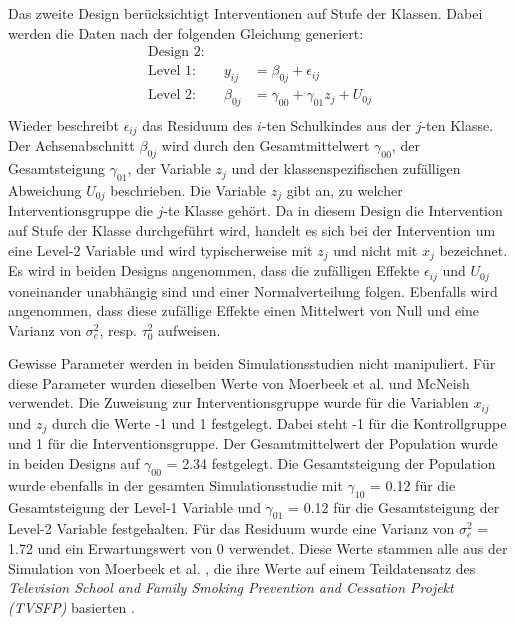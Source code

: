 \documentclass[12pt]{article}\usepackage[]{graphicx}\usepackage[]{color}
\begin{document}
Das zweite Design berücksichtigt Interventionen auf Stufe der Klassen. Dabei werden die Daten nach der folgenden Gleichung generiert:
\begin{equation} 
\begin{split}
 \text{Design 2:}\\
  \text{Level 1:}  \qquad y_{ij} & = \beta_{0j} + \epsilon_{ij}\\
 \text{Level 2:} \qquad \beta_{0j} & = \gamma_{00} + \gamma_{01}z_{j} + U_{0j}\\
\end{split}	
\end{equation} 
Wieder beschreibt $\epsilon_{ij}$ das Residuum des $i$-ten Schulkindes aus der $j$-ten Klasse. Der Achsenabschnitt $\beta_{0j}$ wird durch den Gesamtmittelwert $\gamma_{00}$, der Gesamtsteigung $\gamma_{01}$, der Variable $z_{j}$ und der klassenspezifischen zufälligen Abweichung $U_{0j}$ beschrieben. Die Variable $z_{j}$ gibt an, zu welcher Interventionsgruppe die $j$-te Klasse gehört. Da in diesem Design die Intervention auf Stufe der Klasse durchgeführt wird, handelt es sich bei der Intervention um eine Level-2 Variable und wird typischerweise mit $z_{j}$ und nicht mit $x_{j}$ bezeichnet. Es wird in beiden Designs angenommen, dass die zufälligen Effekte $\epsilon_{ij}$ und $U_{0j}$ voneinander unabhängig sind und einer Normalverteilung folgen. Ebenfalls wird angenommen, dass diese zufällige Effekte einen Mittelwert von Null und eine Varianz von $\sigma^{2}_{e}$, resp. $\tau^{2}_{0}$ aufweisen.

Gewisse Parameter werden in beiden Simulationsstudien nicht manipuliert. Für diese Parameter wurden dieselben Werte von Moerbeek et al. \citeyearpar{MOERBEEK2003341} und McNeish \citeyearpar{mcneish2014analyzing} verwendet. Die Zuweisung zur Interventionsgruppe wurde für die Variablen $x_{ij}$ und $z_{j}$ durch die Werte -1 und 1 festgelegt. Dabei steht -1 für die Kontrollgruppe und 1 für die Interventionsgruppe. Der Gesamtmittelwert der Population wurde in beiden Designs auf $\gamma_{00}$ = 2.34 festgelegt. Die Gesamtsteigung der Population wurde ebenfalls in der gesamten Simulationsstudie mit $\gamma_{10}$ = 0.12 für die Gesamtsteigung der Level-1 Variable und $\gamma_{01}$ = 0.12 für die Gesamtsteigung der Level-2 Variable festgehalten. Für das Residuum wurde eine Varianz von $\sigma^{2}_{e}$ = 1.72 und ein Erwartungswert von 0 verwendet. Diese Werte stammen alle aus der Simulation von Moerbeek et al. \citeyearpar{MOERBEEK2003341}, die ihre Werte auf einem Teildatensatz des \textit{Television School and Family Smoking Prevention and Cessation Projekt (TVSFP)} basierten \citep{FLAY1995smoking}.
\end{document}
